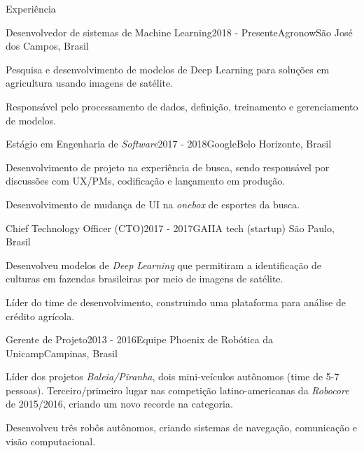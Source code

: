 \documentclass[8pt]{resume}
\newcommand{\tit}[1]{\textit{#1}}
\begin{document}
\begin{rSection}{Experiência}

\begin{rSubsection}{Desenvolvedor de sistemas de Machine Learning}{2018 - Presente}{Agronow}{São José dos Campos, Brasil}
    \item Pesquisa e desenvolvimento de modelos de Deep Learning para soluções em agricultura usando imagens de satélite.
    \item Responsável pelo processamento de dados, definição, treinamento e gerenciamento de modelos.
\end{rSubsection}

\begin{rSubsection}{Estágio em Engenharia de \tit{Software}}{2017 - 2018}{Google}{Belo Horizonte, Brasil}
    \item Desenvolvimento de projeto na experiência de busca, sendo responsável
        por discussões com UX/PMs, codificação e lançamento em produção.
    \item Desenvolvimento de mudança de UI na \tit{onebox} de esportes da busca.
\end{rSubsection}

\begin{rSubsection}{Chief Technology Officer (CTO)}{2017 - 2017}{GAIIA tech (startup)}
    {São Paulo, Brasil}
    \item Desenvolveu modelos de \tit{Deep Learning} que permitiram a identificação
        de culturas em fazendas brasileiras por meio de imagens de satélite.
    \item Líder do time de desenvolvimento, construindo uma plataforma para
        análise de crédito agrícola.
\end{rSubsection}

\begin{rSubsection}{Gerente de Projeto}{2013 - 2016}{Equipe Phoenix de Robótica da Unicamp}{Campinas, Brasil}
    \item Líder dos projetos \tit{Baleia/Piranha}, dois mini-veículos
        autônomos (time de 5-7 pessoas).
        Terceiro/primeiro lugar nas competição latino-americanas da
        \tit{Robocore} de 2015/2016, criando um novo recorde na categoria.
    \item Desenvolveu três robôs autônomos, criando sistemas de
        navegação, comunicação e visão computacional.
\end{rSubsection}


\end{rSection}
\end{document}
